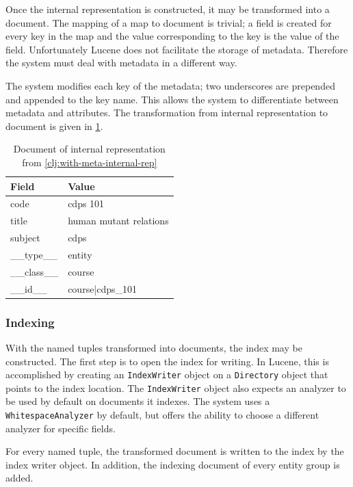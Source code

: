 			Once the internal representation is constructed, it may be transformed into a document.  The mapping of a map to document is trivial; a field is created for every key in the map and the value corresponding to the key is the value of the field.  Unfortunately Lucene does not facilitate the storage of metadata.  Therefore the system must deal with metadata in a different way.
			
			The system modifies each key of the metadata; two underscores are prepended and appended to the key name.  This allows the system to differentiate between metadata and attributes.  The transformation from internal representation to document is given in \cref{tbl:internal-rep-to-document}.
			
			\begin{table}
				\centering
				
				\begin{tabular}{ll}
					\toprule
					Field & Value \\
					\midrule
					code & cdps 101 \\
					title & human mutant relations \\
					subject & cdps \\
					\_\_type\_\_ & entity \\
					\_\_class\_\_ & course \\
					\_\_id\_\_ & course|cdps\_101 \\
					\bottomrule
				\end{tabular}
				
				\caption{Document of internal representation from \cref{clj:with-meta-internal-rep}}
				\label{tbl:internal-rep-to-document}
			\end{table}
		
		\subsubsection{Indexing}
			With the named tuples transformed into documents, the index may be constructed.  The first step is to open the index for writing.  In Lucene, this is accomplished by creating an \texttt{IndexWriter} object on a \texttt{Directory} object that points to the index location.  The \texttt{IndexWriter} object also expects an analyzer to be used by default on documents it indexes.  The system uses a \texttt{WhitespaceAnalyzer} by default, but offers the ability to choose a different analyzer for specific fields.
			
			For every named tuple, the transformed document is written to the index by the index writer object.  In addition, the indexing document of every entity group is added.
		
